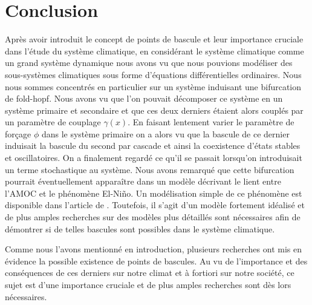 \section{Conclusion}

Après avoir introduit le concept de points de bascule et leur importance cruciale dans l'étude du système climatique, en considérant le système climatique comme un grand système dynamique nous avons vu que nous pouvions modéliser des sous-systèmes climatiques sous forme d'équations différentielles ordinaires. Nous nous sommes concentrés en particulier sur un système induisant une bifurcation de fold-hopf. Nous avons vu que l'on pouvait décomposer ce système en un système primaire et secondaire et que ces deux derniers étaient alors couplés par un paramètre de couplage $\gamma(x)$. En faisant lentement varier le paramètre de forçage $\phi$ dans le système primaire on a alors vu que la bascule de ce dernier induisait la bascule du second par cascade et ainsi la coexistence d'états stables et oscillatoires. On a finalement regardé ce qu'il se passait lorsqu'on introduisait un terme stochastique au système. Nous avons remarqué que cette bifurcation pourrait éventuellement apparaître dans un modèle décrivant le lient entre l'AMOC et le phénomène El-Niño. Un modélisation simple de ce phénomène est disponible dans l'article de \cite{dekker_cascading_2018}. Toutefois, il s'agit d'un modèle fortement idéalisé et de plus amples recherches sur des modèles plus détaillés sont nécessaires afin de démontrer si de telles bascules sont possibles dans le système climatique.

Comme nous l'avons mentionné en introduction, plusieurs recherches ont mis en évidence la possible existence de points de bascules. Au vu de l'importance et des conséquences de ces derniers sur notre climat et à fortiori sur notre société, ce sujet est d'une importance cruciale et de plus amples recherches sont dès lors nécessaires.

